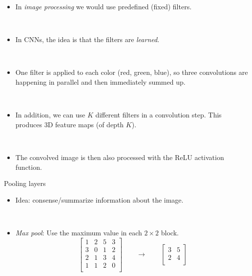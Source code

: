 \documentclass[
  10pt,
  ignorenonframetext,
]{beamer}
\providecommand{\tightlist}{%
  \setlength{\itemsep}{0pt}\setlength{\parskip}{0pt}}
\begin{document}
\begin{frame}
\begin{itemize}
\tightlist
\item
  In \emph{image processing} we would use predefined (fixed) filters.
\end{itemize}

\(~\)

\begin{itemize}
\tightlist
\item
  In CNNs, the idea is that the filters are \emph{learned}.
\end{itemize}

\(~\)

\begin{itemize}
\tightlist
\item
  One filter is applied to each color (red, green, blue), so three
  convolutions are happening in parallel and then immediately summed up.
\end{itemize}

\(~\)

\begin{itemize}
\tightlist
\item
  In addition, we can use \(K\) different filters in a convolution step.
  This produces 3D feature maps (of depth \(K\)).
\end{itemize}

\(~\)

\begin{itemize}
\tightlist
\item
  The convolved image is then also processed with the ReLU activation
  function.
\end{itemize}
\end{frame}

\begin{frame}
\begin{block}{Pooling layers}
\protect\hypertarget{pooling-layers}{}
\(~\)

\begin{itemize}
\tightlist
\item
  Idea: consense/summarize information about the image.
\end{itemize}

\(~\)

\begin{itemize}
\tightlist
\item
  \emph{Max pool}: Use the maximum value in each \(2\times 2\) block.
  \[\left[ 
  \begin{matrix}
  1 & 2 & 5 & 3 \\
  3 & 0 & 1 & 2 \\
  2 & 1 & 3 & 4\\
  1 & 1 & 2 & 0 \\
  \end{matrix}
  \right] \qquad \rightarrow \qquad 
  \left[ 
  \begin{matrix}
  3 & 5 \\
  2 & 4 \\
  \end{matrix}\right] \]
\end{itemize}
\end{block}
\end{frame}
\end{document}
